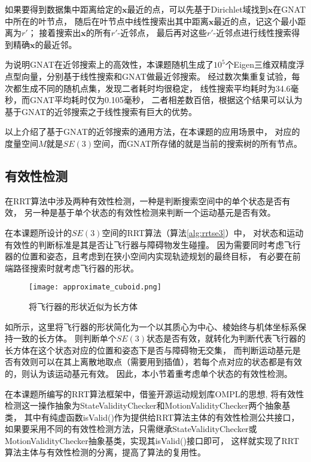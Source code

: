 如果要得到数据集中距离给定的$\bm{x}$最近的点，可以先基于Dirichlet域找到$\bm{x}$在GNAT中所在的叶节点，
随后在叶节点中线性搜索出其中距离$\bm{x}$最近的点，记这个最小距离为$r'$；
接着搜索出$\bm{x}$的所有$r'$-近邻点，
最后再对这些$r'$-近邻点进行线性搜索得到精确$\bm{x}$的最近邻。

为说明GNAT在近邻搜索上的高效性，本课题随机生成了$10^5$个Eigen三维双精度浮点型向量，分别基于线性搜索和GNAT做最近邻搜索。
经过数次集重复试验，每次都生成不同的随机点集，发现二者耗时均很稳定，
线性搜索平均耗时为34.6毫秒，而GNAT平均耗时仅为0.105毫秒，
二者相差数百倍，根据这个结果可以认为基于GNAT的近邻搜索之于线性搜索有巨大的优势。

以上介绍了基于GNAT的近邻搜索的通用方法，在本课题的应用场景中，
对应的度量空间$M$就是$SE(3)$空间，而GNAT所存储的就是当前的搜索树的所有节点。

\subsection{有效性检测}\label{subsec:validaty_checking}
在RRT算法中涉及两种有效性检测，一种是判断搜索空间中的单个状态是否有效，
另一种是基于单个状态的有效性检测来判断一个运动基元是否有效。

在本课题所设计的$SE(3)$空间的RRT算法（算法\ref{alg:rrtse3}）中，
对状态和运动有效性的判断标准是其是否让飞行器与障碍物发生碰撞。
因为需要同时考虑飞行器的位置和姿态，且考虑到在狭小空间内实现轨迹规划的最终目标，
有必要在前端路径搜索时就考虑飞行器的形状。

\begin{figure}[ht]
  \centering
  \texttt{[image: approximate\_cuboid.png]}
  \caption{将飞行器的形状近似为长方体}
  \label{fig:approximate_cuboid}
\end{figure}

如所示，这里将飞行器的形状简化为一个以其质心为中心、棱始终与机体坐标系保持一致的长方体。
则判断单个$SE(3)$状态是否有效，就转化为判断代表飞行器的长方体在这个状态对应的位置和姿态下是否与障碍物无交集，
而判断运动基元是否有效则可以在其上离散地取点（需要用到插值），若每个点对应的状态都是有效的，则认为该运动基元有效。
因此，本小节着重考虑单个状态的有效性检测。

在本课题所编写的RRT算法框架中，借鉴开源运动规划库OMPL\cite{sucan2012open}的思想,
将有效性检测这一操作抽象为StateValidityChecker和MotionValidityChecker两个抽象基类，
其中有纯虚函数isValid()作为提供给RRT算法主体的有效性检测公共接口，
如果要采用不同的有效性检测方法，只需继承StateValidityChecker或MotionValidityChecker抽象基类，实现其isValid()接口即可，
这样就实现了RRT算法主体与有效性检测的分离，提高了算法的复用性。

